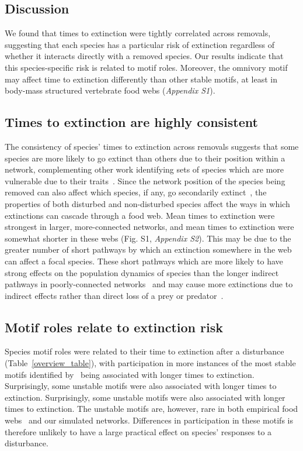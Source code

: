 \documentclass[12pt]{article}
\begin{document}
\begin{spacing}{2.0}
\section*{Discussion}

    We found that times to extinction were tightly correlated across removals, suggesting that each species has a particular risk of extinction regardless of whether it interacts directly with a removed species. 
    Our results indicate that this species-specific risk is related to motif roles.
    Moreover, the omnivory motif may affect time to extinction differently than other stable motifs, at least in body-mass structured vertebrate food webs (\emph{Appendix S1}).


 	\subsection*{Times to extinction are highly consistent}

		The consistency of species' times to extinction across removals suggests that some species are more likely to go extinct than others due to their position within a network, complementing other work identifying sets of species which are more vulnerable due to their traits~\citep{Curtsdotter2011,Ryser2019}. 
		Since the network position of the species being removed can also affect which species, if any, go secondarily extinct~\citep{Wootton2016a,Dunne2002}, the properties of both disturbed and non-disturbed species affect the ways in which extinctions can cascade through a food web.
        Mean times to extinction were strongest in larger, more-connected networks, and mean times to extinction were somewhat shorter in these webs (Fig. S1, \emph{Appendix S2}).
        This may be due to the greater number of short pathways by which an extinction somewhere in the web can affect a focal species.
        These short pathways which are more likely to have strong effects on the population dynamics of species than the longer indirect pathways in poorly-connected networks~\citep{Jordan2002,Jordan2006} and may cause more extinctions due to indirect effects rather than direct loss of a prey or predator~\citet{Wootton2016a}. 


	\subsection*{Motif roles relate to extinction risk}

		Species motif roles were related to their time to extinction after a disturbance (Table~\ref{overview_table}), with participation in more instances of the most stable motifs identified by~\citet{Stouffer2007,Borrelli2015a} being associated with longer times to extinction. 
		Surprisingly, some unstable motifs were also associated with longer times to extinction.
        Surprisingly, some unstable motifs were also associated with longer times to extinction.
		The unstable motifs are, however, rare in both empirical food webs~\citep{Stouffer2007} and our simulated networks.
		Differences in participation in these motifs is therefore unlikely to have a large practical effect on species' responses to a disturbance.
        

\end{spacing}
\end{document}
